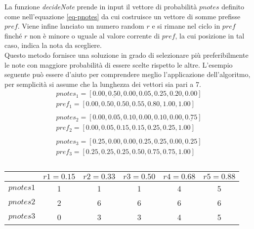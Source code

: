 La funzione \emph{decideNote} prende in input il vettore di probabilità
$pnotes$ definito come nell'equazione \ref{eq-pnotes} da cui costruisce
un vettore di somme prefisse $pref$. Viene infine lanciato un numero
random $r$ e si rimane nel ciclo in $pref$ finché $r$ non è minore o uguale al
valore corrente di $pref$, la cui posizione in tal caso, indica la nota
da scegliere.\\
Questo metodo fornisce una soluzione in grado di selezionare più
preferibilmente le note con maggiore probabilità di essere scelte
rispetto le altre. L'esempio seguente può essere d'aiuto per comprendere
meglio l'applicazione dell'algoritmo, per semplicità si assume che la
lunghezza dei vettori sia pari a 7.
\begin{align*}
pnotes_1 = [0.00,\underline{0.50},0.00,0.05,0.25,0.20,0.00]\\
pref_1   = [0.00,0.50,0.50,0.55,0.80,1.00,1.00]\\\\
pnotes_2 = [0.00,0.05,0.10,0.00,0.10,0.00,\underline{0.75}]\\
pref_2   = [0.00,0.05,0.15,0.15,0.25,0.25,1.00]\\\\
pnotes_3 = [0.25,0.00,0.00,0.25,0.25,0.00,0.25]\\
pref_3   = [0.25,0.25,0.25,0.50,0.75,0.75,1.00]\\\\
\end{align*}
\begin{center}
  \begin{tabular}{ | c | c | c | c | c | c | }
	\hline
             & $r1 = 0.15$  & $r2 = 0.33$ & $r3 = 0.50$ & $r4 = 0.68$ &
$r5 = 0.88$ \\ \hline
    $pnotes1$  & 1 & 1 & 1 & 4 & 5 \\ \hline
    $pnotes2$  & 2 & 6 & 6 & 6 & 6 \\ \hline
    $pnotes3$  & 0 & 3 & 3 & 4 & 5 \\
	\hline
  \end{tabular}
\end{center}

